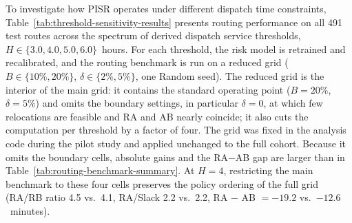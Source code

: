 \documentclass[11pt,a4paper]{article}
\begin{document}
To investigate how PISR operates under different dispatch time constraints, Table~\ref{tab:threshold-sensitivity-results} presents routing performance on all 491 test routes across the spectrum of derived dispatch service thresholds, $H \in \{3.0, 4.0, 5.0, 6.0\}$~hours. For each threshold, the risk model is retrained and recalibrated, and the routing benchmark is run on a reduced grid ($B \in \{10\%, 20\%\}$, $\delta \in \{2\%, 5\%\}$, one Random seed). The reduced grid is the interior of the main grid: it contains the standard operating point ($B = 20\%$, $\delta = 5\%$) and omits the boundary settings, in particular $\delta = 0$, at which few relocations are feasible and RA and AB nearly coincide; it also cuts the computation per threshold by a factor of four. The grid was fixed in the analysis code during the pilot study and applied unchanged to the full cohort. Because it omits the boundary cells, absolute gains and the RA$-$AB gap are larger than in Table~\ref{tab:routing-benchmark-summary}. At $H = 4$, restricting the main benchmark to these four cells preserves the policy ordering of the full grid (RA/RB ratio 4.5 vs.\ 4.1, RA/Slack 2.2 vs.\ 2.2, RA $-$ AB $= -19.2$ vs.\ $-12.6$~minutes).
\end{document}
